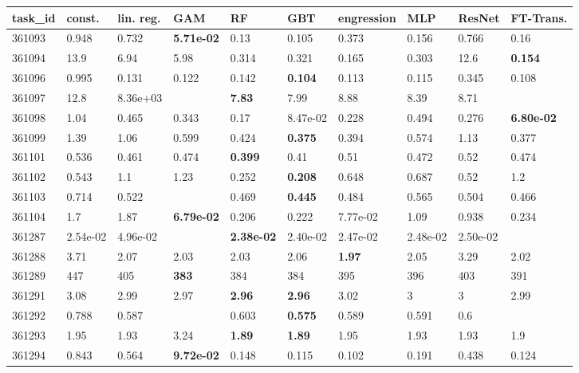 \begin{table}[ht!]
\centering
\begingroup\footnotesize
\begin{tabular}{llllllllll}
  \hline
\hline
task\_id & const. & lin. reg. & GAM & RF & GBT & engression & MLP & ResNet & FT-Trans. \\ 
  \hline
361093 & 0.948 & 0.732 & \textbf{5.71e-02} & 0.13 & 0.105 & 0.373 & 0.156 & 0.766 & 0.16 \\ 
  361094 & 13.9 & 6.94 & 5.98 & 0.314 & 0.321 & 0.165 & 0.303 & 12.6 & \textbf{0.154} \\ 
  361096 & 0.995 & 0.131 & 0.122 & 0.142 & \textbf{0.104} & 0.113 & 0.115 & 0.345 & 0.108 \\ 
  361097 & 12.8 & 8.36e+03 &  & \textbf{7.83} & 7.99 & 8.88 & 8.39 & 8.71 &  \\ 
  361098 & 1.04 & 0.465 & 0.343 & 0.17 & 8.47e-02 & 0.228 & 0.494 & 0.276 & \textbf{6.80e-02} \\ 
  361099 & 1.39 & 1.06 & 0.599 & 0.424 & \textbf{0.375} & 0.394 & 0.574 & 1.13 & 0.377 \\ 
  361101 & 0.536 & 0.461 & 0.474 & \textbf{0.399} & 0.41 & 0.51 & 0.472 & 0.52 & 0.474 \\ 
  361102 & 0.543 & 1.1 & 1.23 & 0.252 & \textbf{0.208} & 0.648 & 0.687 & 0.52 & 1.2 \\ 
  361103 & 0.714 & 0.522 &  & 0.469 & \textbf{0.445} & 0.484 & 0.565 & 0.504 & 0.466 \\ 
  361104 & 1.7 & 1.87 & \textbf{6.79e-02} & 0.206 & 0.222 & 7.77e-02 & 1.09 & 0.938 & 0.234 \\ 
  361287 & 2.54e-02 & 4.96e-02 &  & \textbf{2.38e-02} & 2.40e-02 & 2.47e-02 & 2.48e-02 & 2.50e-02 &  \\ 
  361288 & 3.71 & 2.07 & 2.03 & 2.03 & 2.06 & \textbf{1.97} & 2.05 & 3.29 & 2.02 \\ 
  361289 & 447 & 405 & \textbf{383} & 384 & 384 & 395 & 396 & 403 & 391 \\ 
  361291 & 3.08 & 2.99 & 2.97 & \textbf{2.96} & \textbf{2.96} & 3.02 & 3 & 3 & 2.99 \\ 
  361292 & 0.788 & 0.587 &  & 0.603 & \textbf{0.575} & 0.589 & 0.591 & 0.6 &  \\ 
  361293 & 1.95 & 1.93 & 3.24 & \textbf{1.89} & \textbf{1.89} & 1.95 & 1.93 & 1.93 & 1.9 \\ 
  361294 & 0.843 & 0.564 & \textbf{9.72e-02} & 0.148 & 0.115 & 0.102 & 0.191 & 0.438 & 0.124 \\ 

\end{tabular}
\end{table}
